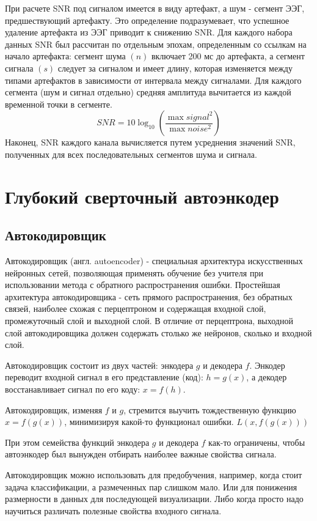 \documentclass[12pt, a4paper, titlepage]{extreport}
\begin{document}
	При расчете SNR под сигналом имеется в виду артефакт, а шум - сегмент ЭЭГ, предшествующий артефакту. Это определение подразумевает, что успешное удаление артефакта из ЭЭГ приводит к снижению SNR. Для каждого набора данных SNR был рассчитан по отдельным эпохам, определенным со ссылкам на начало артефакта: сегмент шума $(n)$ включает 200 мс до артефакта, а сегмент сигнала $(s)$ следует за сигналом и имеет длину, которая изменяется между типами артефактов в зависимости от интервала между сигналами. Для каждого сегмента (шум и сигнал отдельно) средняя амплитуда вычитается из каждой временной точки в сегменте.
	$$
	SNR = 10\log_{10}(\frac{\max signal^2 }{\max noise^2})
	$$
	Наконец, SNR каждого канала вычисляется путем усреднения значений SNR, полученных для всех последовательных сегментов шума и сигнала.
	\section*{Глубокий сверточный автоэнкодер}
	\subsection*{Автокодировщик}
	Автокодировщик (англ. autoencoder) - специальная архитектура искусственных нейронных сетей, позволяющая применять обучение без учителя при использовании метода с обратного распространения ошибки. Простейшая архитектура автокодировщика - сеть прямого распространения, без обратных связей, наиболее схожая с перцептроном и содержащая входной слой, промежуточный слой и выходной слой. В отличие от перцептрона, выходной слой автокодировщика должен содержать столько же нейронов, сколько и входной слой.
	
	Автокодировщик состоит из двух частей: энкодера $g$ и декодера $f$. Энкодер переводит входной сигнал в его представление (код): $h=g(x)$, а декодер восстанавливает сигнал по его коду: $x=f(h)$.
	
	Автокодировщик, изменяя $f$ и $g$, стремится выучить тождественную функцию $x=f(g(x))$, минимизируя какой-то функционал ошибки. $L(x,f(g(x)))$
	
	При этом семейства функций энкодера $g$ и декодера $f$ как-то ограничены, чтобы автоэнкодер был вынужден отбирать наиболее важные свойства сигнала.
	
	Автокодировщик можно использовать для предобучения, например, когда стоит задача классификации, а размеченных пар слишком мало. Или для понижения размерности в данных для последующей визуализации. Либо когда просто надо научиться различать полезные свойства входного сигнала.
\end{document}
